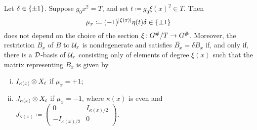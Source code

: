 \begin{prop}\label{prop:self-dual-components}
	Let $\delta \in \{ \pm 1 \}$.
	Suppose $g_0 x^2 = T$,  and  set $t \coloneqq g_0\xi(x)^2 \in T$.
	Then
	\begin{equation}\label{eq:mu_x}
		\mu_{x} \coloneqq (-1)^{|\xi(x)|} \eta(t) \delta \in \{ \pm 1 \}
	\end{equation}
	does not depend on the choice of the section $\xi\colon G^\#/T \to G^\#$.
	Moreover, the restriction $B_x$ of $B$ to $\mathcal U_x$ is nondegenerate and satisfies $\overline{B_x} = \delta B_x$ if, and only if, there is a $\mathcal{D}$-basis of $\mathcal U_{x}$ consisting only of elements of degree $\xi(x)$ such that the matrix representing $B_x$ is given by
	\begin{enumerate}[(i)]
		\item $I_{\kappa(x)} \otimes X_t$ if $\mu_x = +1$;
		\item $J_{\kappa(x)} \otimes X_t$ if $\mu_{x} = -1$, where $\kappa (x)$ is even and $J_{\kappa(x)} \coloneqq \begin{pmatrix}
				      0                & I_{\kappa(x)/2} \\
				      -I_{\kappa(x)/2} & 0
			      \end{pmatrix}$.
	\end{enumerate}
\end{prop}

